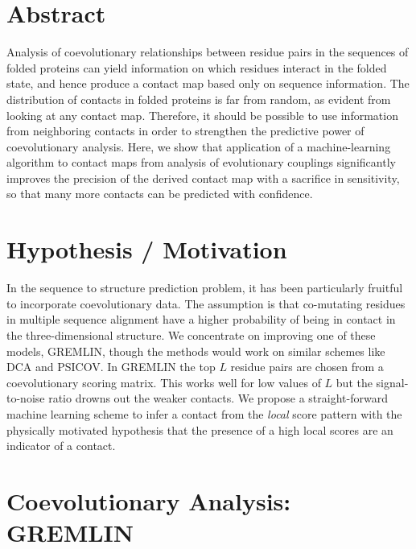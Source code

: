 \documentclass[landscape]{sciposter}
\begin{document}
\begin{multicols}{3}

\section*{Abstract}
Analysis of coevolutionary relationships between residue pairs in the sequences of folded proteins can yield information on which residues interact in the folded state, and hence produce a contact map based only on sequence information. 
The distribution of contacts in folded proteins is far from random, as evident from looking at any contact map. 
Therefore, it should be possible to use information from neighboring contacts in order to strengthen the predictive power of coevolutionary analysis. 
Here, we show that application of a machine-learning algorithm to contact maps from analysis of evolutionary couplings significantly improves the precision of the derived contact map with a sacrifice in sensitivity, so that many more contacts can be predicted with confidence. 

\vfill
\columnbreak

\section*{Hypothesis / Motivation}

In the sequence to structure prediction problem, it has been particularly fruitful to incorporate coevolutionary data.
The assumption is that co-mutating residues in multiple sequence alignment have a higher probability of being in contact in the three-dimensional structure.
\vfill
We concentrate on improving one of these models, GREMLIN\cite{kamisetty2013assessing}, though the methods would work on similar schemes like DCA and PSICOV.
In GREMLIN the top $L$ residue pairs are chosen from a coevolutionary scoring matrix. 
This works well for low values of $L$ but the signal-to-noise ratio drowns out the weaker contacts.
\vfill
We propose a straight-forward machine learning scheme to infer a contact from the \emph{local} score pattern with the physically motivated hypothesis that the presence of a high local scores are an indicator of a contact.

\vfill
\columnbreak

\section*{Coevolutionary Analysis: GREMLIN\cite{kamisetty2013assessing}}


\end{multicols}
\end{document}
